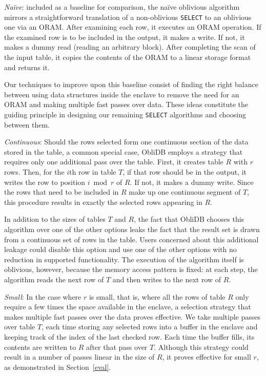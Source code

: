 \documentclass[letterpaper,twocolumn,10pt]{article}
\def\name/{ObliDB}
\begin{document}
\textit{Na\"ive}: included as a baseline for comparison, the na\"ive oblivious algorithm mirrors a straightforward translation of a non-oblivious \texttt{SELECT} to an oblivious one via an ORAM. After examining each row, it executes an ORAM operation. If the examined row is to be included in the output, it makes a write. If not, it makes a dummy read (reading an arbitrary block). After completing the scan of the input table, it copies the contents of the ORAM to a linear storage format and returns it.

Our techniques to improve upon this baseline consist of finding the right balance between using data structures inside the enclave to remove the need for an ORAM and making multiple fast passes over data. These ideas constitute the guiding principle in designing our remaining \texttt{SELECT} algorithms and choosing between them.

\textit{Continuous}: Should the rows selected form one continuous section of the data stored in the table, a common special case, \name/ employs a strategy that requires only one additional pass over the table. First, it creates table $R$ with $r$ rows. Then, for the $i$th row in table $T$, if that row should be in the output, it writes the row to position $i\bmod r$ of $R$. If not, it makes a dummy write. Since the rows that need to be included in $R$ make up one continuous segment of $T$, this procedure results in exactly the selected rows appearing in $R$.

In addition to the sizes of tables $T$ and $R$, the fact that \name/ chooses this algorithm over one of the other options leaks the fact that the result set is drawn from a continuous set of rows in the table. Users concerned about this additional leakage could disable this option and use one of the other options with no reduction in supported functionality. The execution of the algorithm itself is oblivious, however, because the memory access pattern is fixed: at each step, the algorithm reads the next row of $T$ and then writes to the next row of $R$.

\textit{Small}: In the case where $r$ is small, that is, where all the rows of table $R$ only require a few times the space available in the enclave, a selection strategy that makes multiple fast passes over the data proves effective. We take multiple passes over table $T$, each time storing any selected rows into a buffer in the enclave and keeping track of the index of the last checked row. Each time the buffer fills, its contents  are written to $R$ after that pass over $T$. Although this strategy could result in a number of passes linear in the size of $R$, it proves effective for small $r$, as demonstrated in Section~\ref{eval}.
\end{document}
